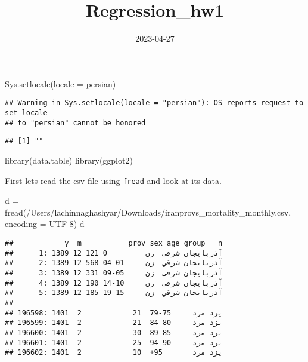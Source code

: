 \documentclass[
]{article}
\title{Regression\_hw1}
\author{}
\date{\vspace{-2.5em}2023-04-27}
\newenvironment{Shaded}{\begin{snugshade}}{\end{snugshade}}
\newcommand{\AttributeTok}[1]{\textcolor[rgb]{0.77,0.63,0.00}{#1}}
\newcommand{\FunctionTok}[1]{\textcolor[rgb]{0.00,0.00,0.00}{#1}}
\newcommand{\NormalTok}[1]{#1}
\newcommand{\OtherTok}[1]{\textcolor[rgb]{0.56,0.35,0.01}{#1}}
\newcommand{\StringTok}[1]{\textcolor[rgb]{0.31,0.60,0.02}{#1}}
\begin{document}
\maketitle

\begin{Shaded}
\begin{Highlighting}[]
\FunctionTok{Sys.setlocale}\NormalTok{(}\AttributeTok{locale =} \StringTok{\textquotesingle{}persian\textquotesingle{}}\NormalTok{)}
\end{Highlighting}
\end{Shaded}

\begin{verbatim}
## Warning in Sys.setlocale(locale = "persian"): OS reports request to set locale
## to "persian" cannot be honored
\end{verbatim}

\begin{verbatim}
## [1] ""
\end{verbatim}

\begin{Shaded}
\begin{Highlighting}[]
\FunctionTok{library}\NormalTok{(data.table)}
\FunctionTok{library}\NormalTok{(ggplot2)}
\end{Highlighting}
\end{Shaded}

First lets read the csv file using \texttt{fread} and look at its data.

\begin{Shaded}
\begin{Highlighting}[]
\NormalTok{d }\OtherTok{=} \FunctionTok{fread}\NormalTok{(}\StringTok{\textquotesingle{}/Users/lachinnaghashyar/Downloads/iranprovs\_mortality\_monthly.csv\textquotesingle{}}\NormalTok{, }\AttributeTok{encoding =} \StringTok{\textquotesingle{}UTF{-}8\textquotesingle{}}\NormalTok{)}
\NormalTok{d}
\end{Highlighting}
\end{Shaded}

\begin{verbatim}
##            y  m           prov sex age_group   n
##      1: 1389 12 آذربايجان شرقي  زن         0 121
##      2: 1389 12 آذربايجان شرقي  زن     01-04 568
##      3: 1389 12 آذربايجان شرقي  زن     05-09 331
##      4: 1389 12 آذربايجان شرقي  زن     10-14 190
##      5: 1389 12 آذربايجان شرقي  زن     15-19 185
##     ---                                         
## 196598: 1401  2            یزد مرد     75-79  21
## 196599: 1401  2            یزد مرد     80-84  21
## 196600: 1401  2            یزد مرد     85-89  30
## 196601: 1401  2            یزد مرد     90-94  25
## 196602: 1401  2            یزد مرد       95+  10
\end{verbatim}
\end{document}
